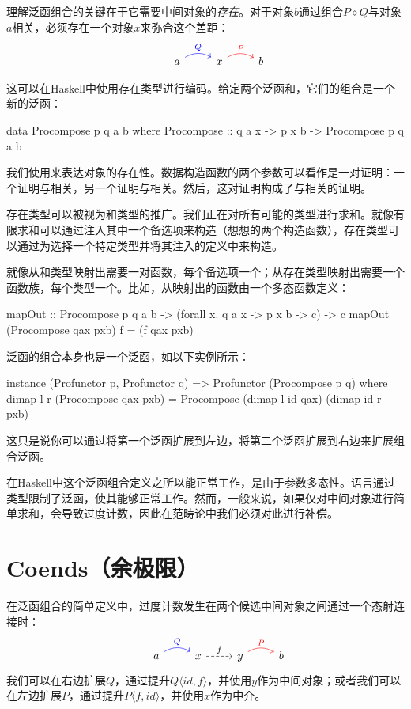 \documentclass[DaoFP]{subfiles}
\begin{document}
 理解泛函组合的关键在于它需要中间对象的\emph{存在}。对于对象$b$通过组合$P \diamond Q$与对象$a$相关，必须存在一个对象$x$来弥合这个差距：
 \[
  \begin{tikzcd}
   & a
   \arrow[r, bend left, blue, "Q"]
   & x
   \arrow[r, bend left, red, "P"]
   & b
  \end{tikzcd}
 \]

 这可以在Haskell中使用存在类型进行编码。给定两个泛函和，它们的组合是一个新的泛函：
 \begin{haskell}
  data Procompose p q a b where
  Procompose ::  q a x -> p x b -> Procompose p q a b
 \end{haskell}
 我们使用来表达对象的存在性。数据构造函数的两个参数可以看作是一对证明：一个证明与相关，另一个证明与相关。然后，这对证明构成了与相关的证明。

 存在类型可以被视为和类型的推广。我们正在对所有可能的类型进行求和。就像有限求和可以通过注入其中一个备选项来构造（想想的两个构造函数），存在类型可以通过为选择一个特定类型并将其注入的定义中来构造。

 就像从和类型映射出需要一对函数，每个备选项一个；从存在类型映射出需要一个函数族，每个类型一个。比如，从映射出的函数由一个多态函数定义：
 \begin{haskell}
  mapOut :: Procompose p q a b -> (forall x. q a x -> p x b -> c) -> c
  mapOut (Procompose qax pxb) f = (f qax pxb)
 \end{haskell}

 泛函的组合本身也是一个泛函，如以下实例所示：
 \begin{haskell}
  instance (Profunctor p, Profunctor q) => Profunctor (Procompose p q)
  where
  dimap l r (Procompose qax pxb) =
  Procompose (dimap l id qax) (dimap id r pxb)
 \end{haskell}
 这只是说你可以通过将第一个泛函扩展到左边，将第二个泛函扩展到右边来扩展组合泛函。

 在Haskell中这个泛函组合定义之所以能正常工作，是由于参数多态性。语言通过类型限制了泛函，使其能够正常工作。然而，一般来说，如果仅对中间对象进行简单求和，会导致过度计数，因此在范畴论中我们必须对此进行补偿。

 \section{Coends（余极限）}

 在泛函组合的简单定义中，过度计数发生在两个候选中间对象之间通过一个态射连接时：
 \[
  \begin{tikzcd}
   & a
   \arrow[r, bend left, blue, "Q"]
   &x
   \arrow[r, dashed, "f"]
   & y
   \arrow[r, bend left, red, "P"]
   & b
  \end{tikzcd}
 \]
 我们可以在右边扩展$Q$，通过提升$Q \langle id, f \rangle$，并使用$y$作为中间对象；或者我们可以在左边扩展$P$，通过提升$P \langle f, id \rangle$，并使用$x$作为中介。
\end{document}
